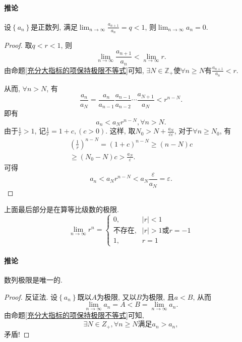 \paragraph{推论}设$\left\{ a_n \right\} $是正数列, 满足$\displaystyle \lim_{n \to \infty} \frac{a_{n+1}}{a_n} = q < 1$, 则$\displaystyle  \lim_{n \to \infty}a_n = 0$.

\begin{proof}
    取$q<r<1$, 则
    \begin{equation}
      \lim_{n \to \infty} \frac{a_{n+1}}{a_n} < \lim_{n \to \infty} r .
    \end{equation}
    由命题\ref{充分大指标的项保持极限不等式}可知, $\exists N \in \mathbb{Z}_{+}$使$\forall n \ge N$有$\displaystyle \frac{a_{n+1}}{a_n} < r$.
    
    从而, $\forall  n> N$, 有
    \begin{equation}
      \frac{a_n}{a_N} = \frac{a_n}{a_{n-1}} \frac{a_{n-1}}{a_{n-2}} \cdots \frac{a_{N+1}}{a_N} < r^{n-N}. 
    \end{equation}
    即有
    \begin{equation}
      a_n<a_N r^{n-N}, \forall n>N.
    \end{equation}
    由于$\frac{1}{r}>1$, 记$\frac{1}{r} = 1+c ,(c>0)$. 这样, 取$N_0>N+ \frac{a_N}{c\varepsilon}$, 对于$\forall n \ge N_0$, 有
    \begin{gather}
        \left( \frac{1}{r} \right) ^{n-N} = (1+c)^{n-N} \ge (n-N) c 
        \\
        \ge (N_0-N)c 
        > \frac{a_N}{\varepsilon}.
    \end{gather}
    可得
    \begin{equation}
      a_n < a_N r^{n-N} < a_N  \frac{\varepsilon}{a_N} = \varepsilon.
    \end{equation}
\end{proof}

上面最后部分是在算等比级数的极限.
\begin{equation}
  \lim_{n \to \infty}r^n = \begin{cases} 
    0, & |r|<1 
    \\ 
    \text{不存在}, & |r| > 1 \text{或} r=-1
    \\
    1 , & r=1
  \end{cases}
\end{equation}

\paragraph{推论}数列极限是唯一的.
\begin{proof}
    反证法. 设$\left\{ a_n \right\} $既以$A$为极限, 又以$B$为极限, 且$a<B$, 从而
    \begin{equation}
      \lim_{n \to \infty}a_n = A<B = \lim_{n \to \infty}a_n.
    \end{equation}
    由命题\ref{充分大指标的项保持极限不等式}可知, 
    \begin{equation}
      \exists N \in Z_{+}, \forall n\ge N \text{满足} a_n > a_n,
    \end{equation}
    矛盾!
\end{proof}

